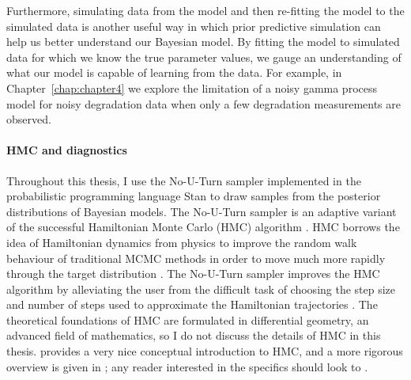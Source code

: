 Furthermore, simulating data from the model and then re-fitting the model to the simulated data is another useful way in which prior predictive simulation can help us better understand our Bayesian model. By fitting the model to simulated data for which we know the true parameter values, we gauge an understanding of what our model is capable of learning from the data. For example, in Chapter~\ref{chap:chapter4} we explore the limitation of a noisy gamma process model for noisy degradation data when only a few degradation measurements are observed.

\paragraph*{HMC and diagnostics}

Throughout this thesis, I use the No-U-Turn sampler \citep{hoffman_2014} implemented in the probabilistic programming language Stan \citep{Stan2022} to draw samples from the posterior distributions of Bayesian models. The No-U-Turn sampler is an adaptive variant of the successful Hamiltonian Monte Carlo (HMC) algorithm \citep{neal2011}. HMC borrows the idea of Hamiltonian dynamics from physics to improve the random walk behaviour of traditional MCMC methods in order to move much more rapidly through the target distribution \citep{BDA2020}. The No-U-Turn sampler improves the HMC algorithm by alleviating the user from the difficult task of choosing the step size and number of steps used to approximate the Hamiltonian trajectories \citep{hoffman_2014}. The theoretical foundations of HMC are formulated in differential geometry, an advanced field of mathematics, so I do not discuss the details of HMC in this thesis. \citet{betancourt_2017} provides a very nice conceptual introduction to HMC, and a more rigorous overview is given in \citet[p.~300]{BDA2020}; any reader interested in the specifics should look to \citet{betancourt_2015}.

